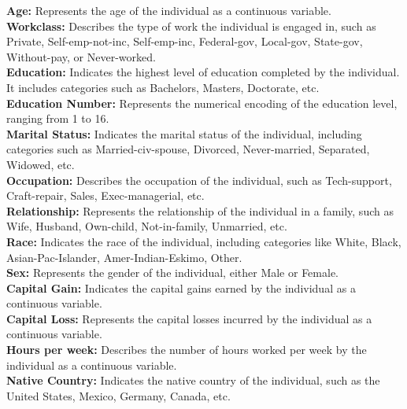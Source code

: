 \documentclass[12pt,a4paper,twoside,openright]{report}
\begin{document}
\textbf{Age:} Represents the age of the individual as a continuous variable.\\

\textbf{Workclass:} Describes the type of work the individual is engaged in, such as Private, Self-emp-not-inc, Self-emp-inc, Federal-gov, Local-gov, State-gov, Without-pay, or Never-worked.\\

\textbf{Education:} Indicates the highest level of education completed by the individual. It includes categories such as Bachelors, Masters, Doctorate, etc.\\

\textbf{Education Number:} Represents the numerical encoding of the education level, ranging from 1 to 16.\\

\textbf{Marital Status:} Indicates the marital status of the individual, including categories such as Married-civ-spouse, Divorced, Never-married, Separated, Widowed, etc.\\

\textbf{Occupation:} Describes the occupation of the individual, such as Tech-support, Craft-repair, Sales, Exec-managerial, etc.\\

\textbf{Relationship:} Represents the relationship of the individual in a family, such as Wife, Husband, Own-child, Not-in-family, Unmarried, etc.\\

\textbf{Race: }Indicates the race of the individual, including categories like White, Black, Asian-Pac-Islander, Amer-Indian-Eskimo, Other.\\

\textbf{Sex:} Represents the gender of the individual, either Male or Female.\\

\textbf{Capital Gain:} Indicates the capital gains earned by the individual as a continuous variable.\\

\textbf{Capital Loss:} Represents the capital losses incurred by the individual as a continuous variable.\\

\textbf{Hours per week:} Describes the number of hours worked per week by the individual as a continuous variable.\\

\textbf{Native Country:} Indicates the native country of the individual, such as the United States, Mexico, Germany, Canada, etc.\\
\end{document}
